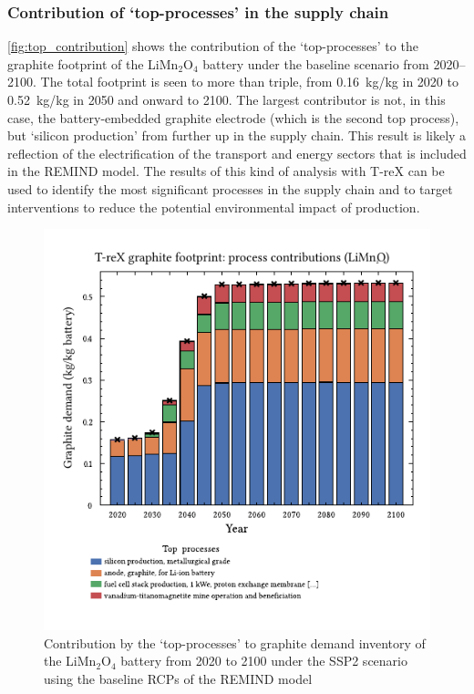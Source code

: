 \documentclass[a4paper,fleqn]{cas-dc}
\begin{document}
\subsubsection{Contribution of `top-processes' in the supply chain}\label{sec:results-case_study-topprocesses}

\autoref{fig:top_contribution} shows the contribution of the `top-processes' to the graphite footprint of the  LiMn\(_2\)O\(_4\) battery under the baseline scenario from 2020--2100. The total footprint is seen to more than triple, from 0.16~kg/kg in 2020 to 0.52~kg/kg in 2050 and onward to 2100. The largest contributor is not, in this case, the battery-embedded graphite electrode (which is the second top process), but `silicon production' from further up in the supply chain. This result is likely a reflection of the electrification of the transport and energy sectors that is included in the REMIND model. The results of this kind of analysis with T-reX can be used to identify the most significant processes in the supply chain and to target interventions to reduce the potential environmental impact of production.

\begin{figure}[!htbp]
	\centering
	\includegraphics[width=0.8\columnwidth]{figs/T-reX-wastefootprint-processcontributions.pdf}
	\caption{Contribution by the `top-processes' to graphite demand inventory of the LiMn\(_2\)O\(_4\) battery from 2020 to 2100 under the SSP2 scenario using the baseline RCPs of the REMIND model}\label{fig:top_contribution}
\end{figure} 
\end{document}
